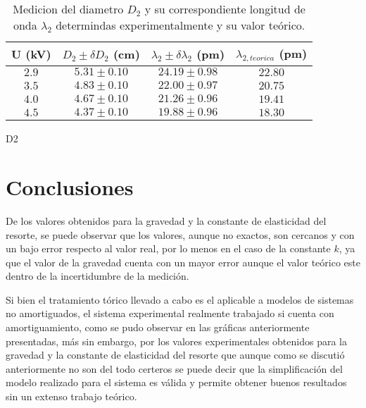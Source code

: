 \documentclass[10pt]{article}
\begin{document}
    \begin{table}[H]
        \centering
        \resizebox{3.4in}{!} {
            \begin{tabular}{cccc}
                \hline
                \multicolumn{1}{l|}{U (kV)} & \multicolumn{1}{l|}{$D_2 \pm \delta D_2$ (cm)}    & \multicolumn{1}{l|}{$\lambda_2 \pm \delta \lambda_2 $ (pm)}   & $\lambda_{2,teorica}$ (pm) \\ \hline
                $2.9$                       & $5.31 \pm 0.10$                                           & $24.19 \pm 0.98$                                                       & $ 22.80 $                      \\
                $3.5$                       & $4.83 \pm 0.10$                                           & $22.00 \pm 0.97$                                                       & $ 20.75 $                      \\
                $4.0$                       & $4.67 \pm 0.10$                                           & $21.26 \pm 0.96$                                                       & $ 19.41 $                      \\
                $4.5$                       & $4.37 \pm 0.10$                                           & $19.88 \pm 0.96$                                                       & $ 18.30 $                      \\ \hline
            \end{tabular}
        }
        \label{tab:datos}D2
        \caption{Medicion del diametro $D_2$ y su correspondiente longitud de onda $\lambda_2$ determindas experimentalmente y su valor teórico.}
    \end{table}

    \section{Conclusiones}
        De los valores obtenidos para la gravedad y la constante de elasticidad del resorte, se puede observar que los valores, aunque no exactos, son cercanos y con un bajo error respecto al valor real, por lo menos en el caso de la constante $k$, ya que el valor de la gravedad cuenta con un mayor error aunque el valor teórico este dentro de la incertidumbre de la medición.

        Si bien el tratamiento tórico llevado a cabo es el aplicable a modelos de sistemas no amortiguados, el sistema experimental realmente trabajado si cuenta con amortiguamiento, como se pudo observar en las gráficas anteriormente presentadas, más sin embargo, por los valores experimentales obtenidos para la gravedad y la constante de elasticidad del resorte que aunque como se discutió anteriormente no son del todo certeros se puede decir que la simplificación del modelo realizado para el sistema es válida y permite obtener buenos resultados sin un extenso trabajo teórico.
\end{document}
